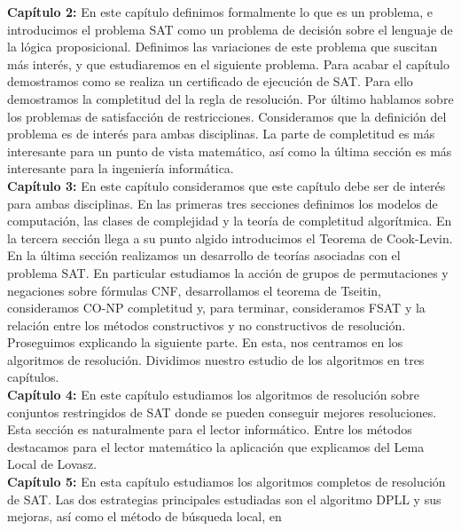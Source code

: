 \textbf{Capítulo 2:} En este capítulo definimos formalmente lo que es un problema, e introducimos el problema SAT como un problema de decisión sobre el lenguaje de la lógica proposicional. Definimos las variaciones de este problema que suscitan más interés, y que estudiaremos en el siguiente problema. Para acabar el capítulo demostramos como se realiza un certificado de ejecución de SAT. Para ello demostramos la completitud del la regla de resolución. Por último hablamos sobre los problemas de satisfacción de restricciones. Consideramos que la definición del problema es de interés para ambas disciplinas. La parte de completitud es más interesante para un punto de vista matemático, así como la última sección es más interesante para la ingeniería informática.\\

\textbf{Capítulo 3:}  En este capítulo consideramos que este capítulo debe ser de interés para ambas disciplinas. En las primeras tres secciones definimos los modelos de computación, las clases de complejidad y la teoría de completitud algorítmica. En la tercera sección llega a su punto algido introducimos el Teorema de Cook-Levin.
En la última sección realizamos un desarrollo de teorías asociadas con el problema SAT. En particular estudiamos la acción de grupos de permutaciones y negaciones sobre fórmulas CNF, desarrollamos el teorema de Tseitin, consideramos CO-NP completitud y, para terminar, consideramos FSAT y la relación entre los métodos constructivos y no constructivos de resolución.\\


Proseguimos explicando la siguiente parte. En esta, nos centramos en los algoritmos de resolución. Dividimos nuestro estudio de los algoritmos en tres capítulos.\\


\textbf{Capítulo 4:} En este capítulo estudiamos los algoritmos de resolución sobre conjuntos restringidos de SAT donde se pueden conseguir mejores resoluciones. Esta sección es naturalmente para el lector informático. Entre los métodos destacamos para el lector matemático la aplicación que explicamos del Lema Local de Lovasz.\\

\textbf{Capítulo 5:} En esta capítulo estudiamos los algoritmos completos de resolución de SAT. Las dos estrategias principales estudiadas son el algoritmo DPLL y sus mejoras, así como el método de búsqueda local, en 



\endinput
